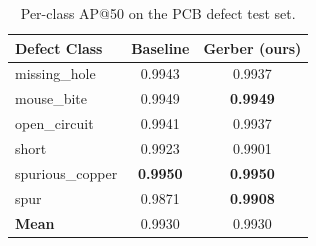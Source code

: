 \begin{table}[t]
\centering
\caption{Per-class AP@50 on the PCB defect test set.}
\label{tab:perclass}
\begin{tabular}{lcc}
\toprule
\textbf{Defect Class} & \textbf{Baseline} & \textbf{Gerber (ours)} \\
\midrule
missing\_hole    & 0.9943 & 0.9937 \\
mouse\_bite      & 0.9949 & \textbf{0.9949} \\
open\_circuit    & 0.9941 & 0.9937 \\
short            & 0.9923 & 0.9901 \\
spurious\_copper & \textbf{0.9950} & \textbf{0.9950} \\
spur             & 0.9871 & \textbf{0.9908} \\
\midrule
\textbf{Mean}    & 0.9930 & 0.9930 \\
\bottomrule
\end{tabular}
\end{table}
